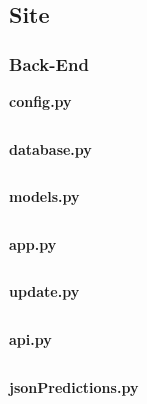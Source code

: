     \pagebreak
    \subsection{Site}
        \subsubsection{Back-End}
            \textbf{config.py}\vspace{3mm}
            \inputminted[linenos=true, xleftmargin=2pt, tabsize=4, breaklines]{python}{../source/site/config.py}
            \vspace{5mm}\textbf{database.py}\vspace{3mm}
            \inputminted[linenos=true, xleftmargin=2pt, tabsize=4, breaklines]{python}{../source/site/database.py}
            \vspace{5mm}\textbf{models.py}\vspace{3mm}
            \inputminted[linenos=true, xleftmargin=2pt, tabsize=4, breaklines]{python}{../source/site/models.py}
            \pagebreak
            \textbf{app.py}\vspace{3mm}
            \inputminted[linenos=true, xleftmargin=2pt, tabsize=4, breaklines]{python}{../source/site/app.py}
            \pagebreak
            \textbf{update.py}\vspace{3mm}
            \inputminted[linenos=true, xleftmargin=2pt, tabsize=4, breaklines]{python}{../source/site/update.py}
            \pagebreak
            \textbf{api.py}\vspace{3mm}
            \inputminted[linenos=true, xleftmargin=2pt, tabsize=4, breaklines]{python}{../source/site/api.py}
            \pagebreak
            \textbf{jsonPredictions.py}\vspace{3mm}
            \inputminted[linenos=true, xleftmargin=2pt, tabsize=4, breaklines]{python}{../source/site/jsonPredictions.py}

        \pagebreak
